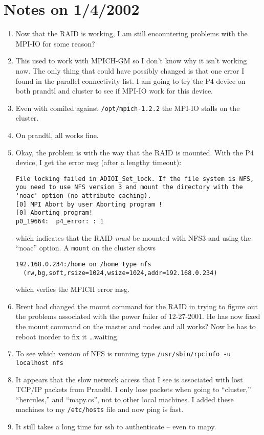\documentclass[10pt]{article}
\begin{document}
\section*{\normalsize Notes on 1/4/2002}
\begin{enumerate}
\item Now that the RAID is working, I am still encountering problems with the
MPI-IO for some reason?

\item This used to work with MPICH-GM so I don't know why it isn't working
now.  The only thing that could have possibly changed is that one error I
found in the parallel connectivity list.  I am going to try the P4 device on
both prandtl and cluster to see if MPI-IO work for this device.

\item Even with comiled against {\tt /opt/mpich-1.2.2} the MPI-IO stalls on
the cluster.

\item On prandtl, all works fine.

\item Okay, the problem is with the way that the RAID is mounted.  With the P4
device, I get the error msg (after a lengthy timeout):
\begin{verbatim}
File locking failed in ADIOI_Set_lock. If the file system is NFS, 
you need to use NFS version 3 and mount the directory with the 
'noac' option (no attribute caching).
[0] MPI Abort by user Aborting program !
[0] Aborting program!
p0_19664:  p4_error: : 1
\end{verbatim}
which indicates that the RAID {\em must} be mounted with NFS3 and using the
``noac'' option.  A {\tt mount} on the cluster shows
\begin{verbatim}
192.168.0.234:/home on /home type nfs 
  (rw,bg,soft,rsize=1024,wsize=1024,addr=192.168.0.234)
\end{verbatim}
which verfies the MPICH error msg.

\item Brent had changed the mount command for the RAID in trying to figure out
the problems associated with the power failer of 12-27-2001.  He has now fixed
the mount command on the master and nodes and all works?  Now he has to reboot
inorder to fix it \dots waiting.

\item To see which version of NFS is running type 
{\tt /usr/sbin/rpcinfo -u localhost nfs}

\item It appears that the slow network access that I see is associated with
lost TCP/IP packets from Prandtl.  I only lose packets when going to
``cluster,'' ``hercules,'' and ``mapy.cs'', not to other local machines.  I
added these machines to my {\tt /etc/hosts} file and now ping is fast.

\item It still takes a long time for ssh to authenticate -- even to mapy.
\end{enumerate}
\end{document}
